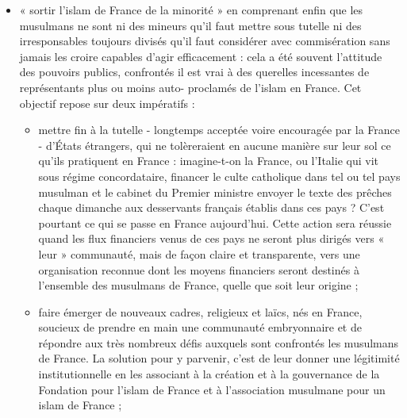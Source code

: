 \begin{itemize}
\item
  « sortir l'islam de France de la minorité » en comprenant enfin que
  les musulmans ne sont ni des mineurs qu'il faut mettre sous tutelle ni
  des irresponsables toujours divisés qu'il faut considérer avec
  commisération sans jamais les croire capables d'agir efficacement :
  cela a été souvent l'attitude des pouvoirs publics, confrontés il est
  vrai à des querelles incessantes de représentants plus ou moins auto-
  proclamés de l'islam en France. Cet objectif repose sur deux
  impératifs :

  \begin{itemize}
  \item
    mettre fin à la tutelle - longtemps acceptée voire encouragée par la
    France - d'États étrangers, qui ne tolèreraient en aucune manière
    sur leur sol ce qu'ils pratiquent en France : imagine-t-on la
    France, ou l'Italie qui vit sous régime concordataire, financer le
    culte catholique dans tel ou tel pays musulman et le cabinet du
    Premier ministre envoyer le texte des prêches chaque dimanche aux
    desservants français établis dans ces pays ? C'est pourtant ce qui
    se passe en France aujourd'hui. Cette action sera réussie quand les
    flux financiers venus de ces pays ne seront plus dirigés vers « leur
    » communauté, mais de façon claire et transparente, vers une
    organisation reconnue dont les moyens financiers seront destinés à
    l'ensemble des musulmans de France, quelle que soit leur origine ;
  \item
    faire émerger de nouveaux cadres, religieux et laïcs, nés en France,
    soucieux de prendre en main une communauté embryonnaire et de
    répondre aux très nombreux défis auxquels sont confrontés les
    musulmans de France. La solution pour y parvenir, c'est de leur
    donner une légitimité institutionnelle en les associant à la
    création et à la gouvernance de la Fondation pour l'islam de France
    et à l'association musulmane pour un islam de France ;
  \end{itemize}


\end{itemize}

